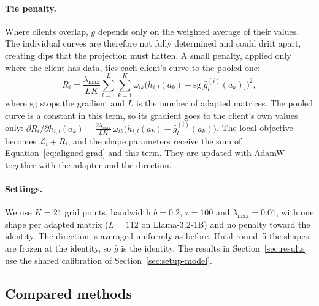 \documentclass[11pt]{article}
\begin{document}
\paragraph{Tie penalty.}
Where clients overlap, $\bar g$ depends only on the weighted average of their values.
The individual curves are therefore not fully determined and could drift apart, creating dips that the projection must flatten.
A small penalty, applied only where the client has data, ties each client's curve to the pooled one:
\begin{equation}
  R_i = \frac{\lambda_{\max}}{LK}\sum_{l=1}^{L}\sum_{k=1}^{K} \omega_{ik}\bigl(h_{i,l}(a_k) - \mathrm{sg}\bigl[\bar g^{(i)}_l(a_k)\bigr]\bigr)^2,
\end{equation}
where $\mathrm{sg}$ stops the gradient and $L$ is the number of adapted matrices.
The pooled curve is a constant in this term, so its gradient goes to the client's own values only:
$\partial R_i/\partial h_{i,l}(a_k) = \tfrac{2\lambda_{\max}}{LK}\,\omega_{ik}\bigl(h_{i,l}(a_k)-\bar g^{(i)}_l(a_k)\bigr)$.
The local objective becomes $\mathcal{L}_i + R_i$, and the shape parameters receive the sum of Equation~\ref{eq:aligned-grad} and this term.
They are updated with AdamW together with the adapter and the direction.

\paragraph{Settings.}
We use $K=21$ grid points, bandwidth $b=0.2$, $\tau=100$ and $\lambda_{\max}=0.01$, with one shape per adapted matrix ($L=112$ on Llama-3.2-1B) and no penalty toward the identity.
The direction is averaged uniformly as before.
Until round~5 the shapes are frozen at the identity, so $\bar g$ is the identity.
The results in Section~\ref{sec:results} use the shared calibration of Section~\ref{sec:setup-model}.

\subsection{Compared methods}
\label{sec:setup-baselines}
\end{document}
